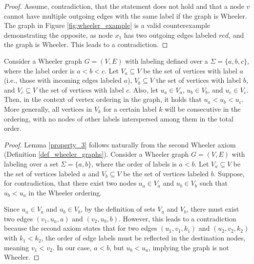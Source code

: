 \begin{proof}
    Assume,   contradiction, that the statement does not hold and that a node $v$ cannot have multiple outgoing edges with the same label if the graph is Wheeler. The graph in Figure \ref{fig:wheeler_example} is a valid counterexample demonstrating the opposite, as node $x_1$ has two outgoing edges labeled $red$, and the graph is Wheeler. This leads to a contradiction.
\end{proof}

\begin{lemma} \label{property_3}
    Consider a Wheeler graph $G=(V,E)$ with labeling defined over a   $\Sigma=\{a,b,c\}$, where the label order is $a<b<c$. Let $V_a \subseteq V$ be the set of vertices with label $a$ (i.e., those with incoming edges labeled $a$), $V_b \subseteq V$ the set of vertices with label $b$, and $V_c \subseteq V$ the set of vertices with label $c$. Also, let $u_a \in V_a$, $u_b \in V_b$, and $u_c \in V_c$. Then, in the context of vertex ordering in the graph, it holds that $u_a < u_b < u_c$. More generally, all vertices in $V_k$ for a certain label $k$ will be consecutive in the ordering, with no nodes of other labels interspersed among them in the total order.
\end{lemma}

\begin{proof}
    Lemma \ref{property_3} follows naturally from the second Wheeler axiom (Definition \ref{def_wheeler_graphs}). Consider a Wheeler graph $G=(V,E)$ with labeling over a set $\Sigma=\{a,b\}$, where the order of labels is $a<b$. Let $V_a \subseteq V$ be the set of vertices labeled $a$ and $V_b \subseteq V$ be the set of vertices labeled $b$. Suppose, for contradiction, that there exist two nodes $u_a \in V_a$ and $u_b \in V_b$ such that $u_b < u_a$ in the Wheeler ordering.

    Since $u_a \in V_a$ and $u_b \in V_b$, by the definition of sets $V_a$ and $V_b$, there must exist two edges $(v_1, u_a, a)$ and $(v_2, u_b, b)$. However, this leads to a contradiction because the second axiom states that for two edges $(u_1,v_1,k_1)$ and $(u_2,v_2,k_2)$ with $k_1<k_2$, the order of edge labels must be reflected in the destination nodes, meaning $v_1<v_2$. In our case, $a<b$, but $u_b < u_a$, implying the graph is not Wheeler.
\end{proof}

